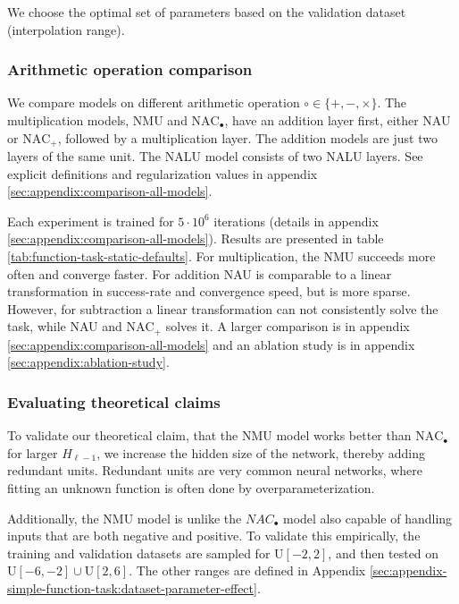 We choose the optimal set of parameters based on the validation dataset (interpolation range).

\subsubsection{Arithmetic operation comparison}
We compare models on different arithmetic operation $\circ \in \{+, -, \times\}$. The multiplication models, NMU and $\mathrm{NAC}_{\bullet}$, have an addition layer first, either NAU or $\mathrm{NAC}_{+}$, followed by a multiplication layer. The addition models are just two layers of the same unit. The NALU model consists of two NALU layers. See explicit definitions and regularization values in appendix \ref{sec:appendix:comparison-all-models}.

Each experiment is trained for $5 \cdot 10^6$ iterations (details in appendix \ref{sec:appendix:comparison-all-models}). Results are presented in table \ref{tab:function-task-static-defaults}. For multiplication, the NMU succeeds more often and converge faster. For addition NAU is comparable to a linear transformation in success-rate and convergence speed, but is more sparse. However, for subtraction a linear transformation can not consistently solve the task, while NAU and $\mathrm{NAC}_{+}$ solves it. A larger comparison is in appendix \ref{sec:appendix:comparison-all-models} and an ablation study is in appendix \ref{sec:appendix:ablation-study}.



\subsubsection{Evaluating theoretical claims}

To validate our theoretical claim, that the NMU model works better than $\mathrm{NAC}_{\bullet}$ for larger $H_{\ell-1}$, we increase the hidden size of the network, thereby adding redundant units. Redundant units are very common neural networks, where fitting an unknown function is often done by overparameterization.

Additionally, the NMU model is unlike the $NAC_{\bullet}$ model also capable of handling inputs that are both negative and positive. To validate this empirically, the training and validation datasets are sampled for $\mathrm{U}[-2,2]$, and then tested on $\mathrm{U}[-6,-2] \cup \mathrm{U}[2,6]$. The other ranges are defined in Appendix \ref{sec:appendix-simple-function-task:dataset-parameter-effect}.

